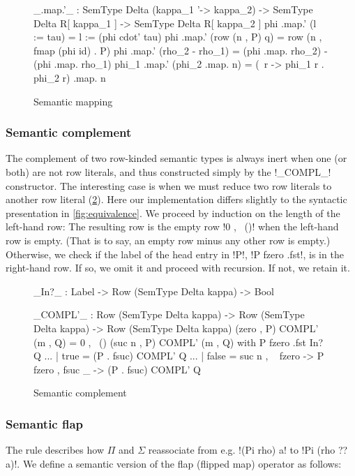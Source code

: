 \documentclass[sigplan,10pt,review]{acmart}\settopmatter{printfolios=true,printccs=false,printacmref=false}
\begin{document}
\begin{figure}
\begin{agda}
_.map.'_ : SemType Delta (kappa_1 '-> kappa_2) -> 
           SemType Delta R[ kappa_1 ] -> 
           SemType Delta R[ kappa_2 ]
phi .map.' (l := tau) = l := (phi cdot' tau)
phi .map.' (row (n , P) q) = row (n , fmap (phi id) . P)
phi .map.' (rho_2 - rho_1) = (phi .map. rho_2) - (phi .map. rho_1)
phi_1 .map.' (phi_2 .map. n) = (\ r -> phi_1 r . phi_2 r) .map. n
\end{agda}
\caption{Semantic mapping}
\label{fig:semantic-mapping}
\end{figure}

\subsubsection{Semantic complement} The complement of two row-kinded semantic types is always inert when one (or both) are not row literals, and thus constructed simply by the !_COMPL_! constructor. The interesting case is when we must reduce two row literals to another row literal (\cref{fig:semantic-complement}). Here our implementation differs slightly to the syntactic presentation in \cref{fig:equivalence}. We proceed by induction on the length of the left-hand row: The resulting row is the empty row !0 , \ ()! when the left-hand row is empty. (That is to say, an empty row minus any other row is empty.) Otherwise, we check if the label of the head entry in !P!, !P fzero .fst!, is in the right-hand row. If so, we omit it and proceed with recursion. If not, we retain it. 

\begin{figure}
\begin{agda}
_In?_ : Label -> Row (SemType Delta kappa) -> Bool

_COMPL'_ : Row (SemType Delta kappa) -> Row (SemType Delta kappa) -> 
           Row (SemType Delta kappa)
(zero , P) COMPL' (m , Q) = 0 , \ () 
(suc n , P) COMPL' (m , Q) with P fzero .fst In? Q 
... | true = (P . fsuc) COMPL' Q
... | false = suc n , \ { fzero -> P fzero , 
                          fsuc _ -> (P . fsuc) COMPL' Q }
\end{agda}
\caption{Semantic complement}
\label{fig:semantic-complement}
\end{figure}

\subsubsection{Semantic flap}
The rule  describes how $\Pi$ and $\Sigma$ reassociate from e.g. !(Pi rho) a! to !Pi (rho ?? a)!. We define a semantic version of the flap (flipped map) operator as follows:
\end{document}
